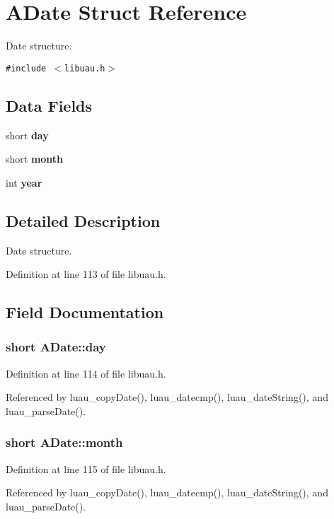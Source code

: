 \section{ADate Struct Reference}
\label{structADate}
Date structure.  


{\tt \#include $<$libuau.h$>$}

\subsection*{Data Fields}
\begin{CompactItemize}
\item 
short {\bf day}
\item 
short {\bf month}
\item 
int {\bf year}
\end{CompactItemize}


\subsection{Detailed Description}
Date structure. 



Definition at line 113 of file libuau.h.

\subsection{Field Documentation}
\subsubsection{\setlength{\rightskip}{0pt plus 5cm}short {\bf ADate::day}}\label{structADate_o0}




Definition at line 114 of file libuau.h.

Referenced by luau\_\-copy\-Date(), luau\_\-datecmp(), luau\_\-date\-String(), and luau\_\-parse\-Date().
\subsubsection{\setlength{\rightskip}{0pt plus 5cm}short {\bf ADate::month}}\label{structADate_o1}




Definition at line 115 of file libuau.h.

Referenced by luau\_\-copy\-Date(), luau\_\-datecmp(), luau\_\-date\-String(), and luau\_\-parse\-Date().
